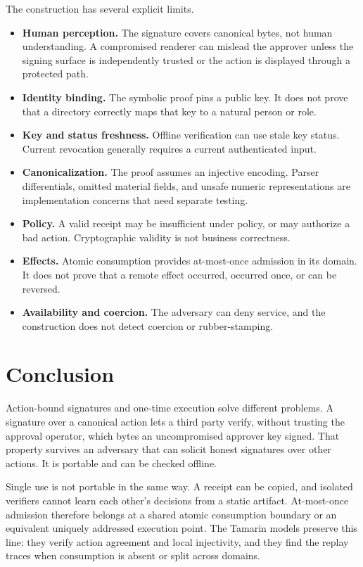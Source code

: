 \documentclass[10.5pt]{article}
\begin{document}
The construction has several explicit limits.

\begin{itemize}[leftmargin=*]
\item \textbf{Human perception.} The signature covers canonical bytes, not human
understanding. A compromised renderer can mislead the approver unless the signing
surface is independently trusted or the action is displayed through a protected
path.
\item \textbf{Identity binding.} The symbolic proof pins a public key. It does not
prove that a directory correctly maps that key to a natural person or role.
\item \textbf{Key and status freshness.} Offline verification can use stale key
status. Current revocation generally requires a current authenticated input.
\item \textbf{Canonicalization.} The proof assumes an injective encoding. Parser
differentials, omitted material fields, and unsafe numeric representations are
implementation concerns that need separate testing.
\item \textbf{Policy.} A valid receipt may be insufficient under policy, or may
authorize a bad action. Cryptographic validity is not business correctness.
\item \textbf{Effects.} Atomic consumption provides at-most-once admission in its
domain. It does not prove that a remote effect occurred, occurred once, or can be
reversed.
\item \textbf{Availability and coercion.} The adversary can deny service, and the
construction does not detect coercion or rubber-stamping.
\end{itemize}

\section{Conclusion}

Action-bound signatures and one-time execution solve different problems. A
signature over a canonical action lets a third party verify, without trusting the
approval operator, which bytes an uncompromised approver key signed. That property
survives an adversary that can solicit honest signatures over other actions. It is
portable and can be checked offline.

Single use is not portable in the same way. A receipt can be copied, and isolated
verifiers cannot learn each other's decisions from a static artifact. At-most-once
admission therefore belongs at a shared atomic consumption boundary or an
equivalent uniquely addressed execution point. The Tamarin models preserve this
line: they verify action agreement and local injectivity, and they find the replay
traces when consumption is absent or split across domains.
\end{document}
